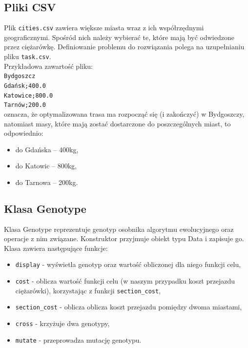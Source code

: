 \documentclass[12pt, oneside, final]{report}
\begin{document}
\subsection{Pliki CSV}\label{sec:csv}
Plik \texttt{cities.csv} zawiera większe miasta wraz z ich współrzędnymi geograficznymi. Spośród nich należy wybierać te, które mają być odwiedzone przez ciężarówkę. Definiowanie problemu do rozwiązania polega na uzupełnianiu pliku \texttt{task.csv}.\\
Przykładowa zawartość pliku:\\
\texttt{\hspace*{2em}Bydgoszcz\\
	\hspace*{2em}Gdańsk;400.0\\
	\hspace*{2em}Katowice;800.0\\
	\hspace*{2em}Tarnów;200.0}\\

oznacza, że optymalizowana trasa ma rozpocząć się (i zakończyć) w Bydgoszczy, natomiast masy, które mają zostać dostarczone do poszczególnych miast, to odpowiednio:
\begin{itemize}
	\item do Gdańska -- 400kg,
	\item do Katowic -- 800kg,
	\item do Tarnowa -- 200kg.
\end{itemize}

\subsection{Klasa Genotype}
Klasa Genotype reprezentuje genotyp osobnika algorytmu ewolucyjnego oraz operacje z nim związane. Konstruktor przyjmuje obiekt typu Data i zapisuje go. Klasa zawiera następujące funkcje:
\begin{itemize}
\item \texttt{display} - wyświetla genotyp oraz wartość obliczonej dla niego funkcji celu,
\item \texttt{cost} - oblicza wartość funkcji celu (w naszym przypadku koszt przejazdu ciężarówki), korzystając z funkcji \texttt{section\_cost},
\item \texttt{section\_cost} - oblicza oblicza koszt przejazdu pomiędzy dwoma miastami,
\item \texttt{cross} - krzyżuje dwa genotypy,
\item \texttt{mutate} - przeprowadza mutację genotypu.
\end{itemize}
\end{document}
